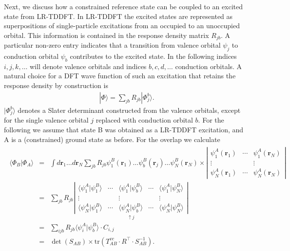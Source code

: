 \documentclass[letterpaper,10pt,english]{sphinxmanual}
\begin{document}
Next, we discuss how a constrained reference state can be coupled to an
excited state from LR-TDDFT. In LR-TDDFT the excited states are
represented as superpositions of single-particle excitations from an
occupied to an unoccupied orbital. This information is contained in the
response density matrix \(R_{jb}\). A particular non-zero entry
indicates that a transition from valence orbital \(\psi_{j}\) to
conduction orbital \(\psi_{b}\) contributes to the excited state. In
the following indices \(i,j,k,\ldots\) will denote valence orbitals
and indices \(b,c,d,\ldots\) conduction orbitals. A natural choice
for a DFT wave function of such an excitation that retains the response
density by construction is
\begin{equation*}
\begin{split}|\Phi\rangle=\sum_{jb}R_{jb}|\Phi_{j}^{b}\rangle.\end{split}
\end{equation*}
\(|\Phi_{j}^{b}\rangle\) denotes a Slater determinant constructed
from the valence orbitals, except for the single valence orbital
\(j\) replaced with conduction orbital \(b\). For the following
we assume that state B was obtained as a LR-TDDFT excitation, and A is a
(constrained) ground state as before. For the overlap we calculate
\begin{equation*}
\begin{split}\begin{aligned}
\langle\Phi_{B}|\Phi_{A}\rangle & = & \int d\mathbf{r}_{1}\ldots d\mathbf{r}_{N}\sum_{jb}R_{jb}\psi_{1}^{B}(\mathbf{r}_{1})\ldots\psi_{b}^{B}(\mathbf{r}_{j})\ldots\psi_{N}^{B}(\mathbf{r}_{N})\times\left|\begin{array}{ccc}
\psi_{1}^{A}(\mathbf{r}_{1}) & \cdots & \psi_{1}^{A}(\mathbf{r}_{N})\\
\vdots &  & \vdots\\
\psi_{N}^{A}(\mathbf{r}_{1}) & \cdots & \psi_{N}^{A}(\mathbf{r}_{N})
\end{array}\right|\nonumber \\
 & = & \sum_{jb}R_{jb}\underset{\uparrow j}{\left|\begin{array}{ccccc}
\langle\psi_{1}^{A}|\psi_{1}^{B}\rangle & \cdots & \langle\psi_{1}^{A}|\psi_{b}^{B}\rangle & \cdots & \langle\psi_{1}^{A}|\psi_{N}^{B}\rangle\\
\vdots &  & \vdots &  & \vdots\\
\langle\psi_{N}^{A}|\psi_{1}^{B}\rangle & \cdots & \langle\psi_{N}^{A}|\psi_{b}^{B}\rangle & \cdots & \langle\psi_{N}^{A}|\psi_{N}^{B}\rangle
\end{array}\right|}\nonumber \\
 & = & \sum_{ijb}R_{jb}\langle\psi_{i}^{A}|\psi_{b}^{B}\rangle\cdot C_{i,j}\nonumber \\
 & = & \det\left(S_{AB}\right)\times\text{tr}\left(T_{AB}^{vc}\cdot R^{\top}\cdot S_{AB}^{-1}\right).\end{aligned}\end{split}
\end{equation*}
\end{document}
